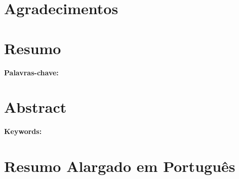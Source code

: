 \documentclass[12pt,a4paper,oneside]{report}
\theoremstyle{tituloplain}
\theoremstyle{titulodef}
\begin{document}
\chapter*{Agradecimentos}


\clearpage
\thispagestyle{empty}
\vspace*{\fill}
\begin{center}
\end{center}
\vspace*{\fill}
\clearpage

\chapter*{Resumo}

\noindent\textbf{Palavras-chave:} %

\chapter*{Abstract}

\noindent\textbf{Keywords:} %

\chapter*{Resumo Alargado em Português}

\tableofcontents
\clearpage
\end{document}
